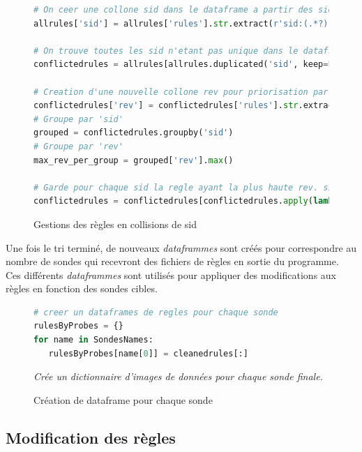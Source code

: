 \begin{figure}[h]%
    \center%
\begin{lstlisting}[language=Python]
# On ceer une collone sid dans le dataframe a partir des sid des regles
allrules['sid'] = allrules['rules'].str.extract(r'sid:(.*?);')

# On trouve toutes les sid n'etant pas unique dans le dataframe
conflictedrules = allrules[allrules.duplicated('sid', keep=False)]

# Creation d'une nouvelle collone rev pour priorisation par rev
conflictedrules['rev'] = conflictedrules['rules'].str.extract(r'rev:(.*?);').astype(int)
# Groupe par 'sid'
grouped = conflictedrules.groupby('sid')
# Groupe par 'rev'
max_rev_per_group = grouped['rev'].max()

# Garde pour chaque sid la regle ayant la plus haute rev. si des regle on la meme sid et rev elles seront non resolu
conflictedrules = conflictedrules[conflictedrules.apply(lambda x: x['rev'] == max_rev_per_group[x['sid']], axis=1)]
\end{lstlisting}
    \caption[Gestions des règles en collision de sid]{Gestions des règles en collisions de sid}\label{fig:HandlingCollisions}
\end{figure}

\vspace{0.5em}

Une fois le tri terminé, de nouveaux \textit{dataframmes} sont créés pour correspondre au nombre de sondes qui recevront des fichiers de règles en sortie du programme. Ces différents \textit{dataframmes} sont utilisés pour appliquer des modifications aux règles en fonction des sondes cibles.

\vspace{1em}

\begin{figure}[h]%
    \center%
\begin{lstlisting}[language=Python]
# creer un dataframes de regles pour chaque sonde
rulesByProbes = {}
for name in SondesNames:
   rulesByProbes[name[0]] = cleanedrules[:]
\end{lstlisting}
{\small
    \textit{Crée un dictionnaire d'images de données pour chaque sonde finale.}
    }
    \caption[Création de dataframe pour chaque sonde]{Création de dataframe pour chaque sonde}\label{fig:CreateDatafBySonde}
\end{figure}

\newpage

\subsection{Modification des règles}
\label{chap3:section1rulesmodif}

